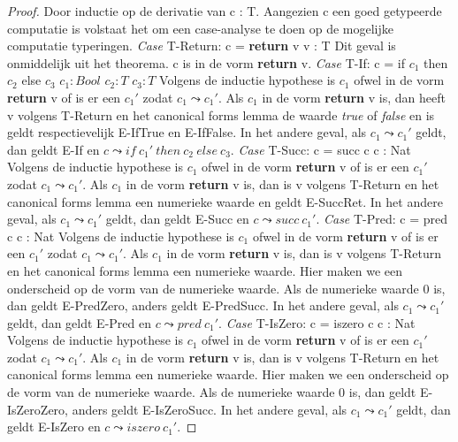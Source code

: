 \begin{proof}
    Door inductie op de derivatie van c : T. Aangezien c een goed getypeerde computatie is volstaat het om een case-analyse te doen op de mogelijke computatie typeringen. \newline
    \indent \textit{Case} T-Return: c = \textbf{return} v \quad v : T \newline
    Dit geval is onmiddelijk uit het theorema. c is in de vorm \textbf{return} v. \newline 
    \indent \textit{Case} T-If: c = if $c_1$ then $c_2$ else $c_3$ \quad $c_1 : Bool$ \quad $c_2 : T$ \quad $c_3 : T$ \newline
    Volgens de inductie hypothese is $c_1$ ofwel in de vorm \textbf{return} v of is er een $c_1'$ zodat $c_1 \leadsto c_1'$. Als $c_1$ in de vorm \textbf{return} v is, dan heeft v volgens T-Return en het canonical forms lemma de waarde \emph{true} of \emph{false} en is geldt respectievelijk E-IfTrue en E-IfFalse. In het andere geval, als $c_1 \leadsto c_1'$ geldt, dan geldt E-If en $c \leadsto if \  c_1' \  then \  c_2 \  else \  c_3$. \newline
    \indent \textit{Case} T-Succ: c = succ c \quad c : Nat \newline
    Volgens de inductie hypothese is $c_1$ ofwel in de vorm \textbf{return} v of is er een $c_1'$ zodat $c_1 \leadsto c_1'$. Als $c_1$ in de vorm \textbf{return} v is, dan is v volgens T-Return en het canonical forms lemma een numerieke waarde en geldt E-SuccRet. In het andere geval, als $c_1 \leadsto c_1'$ geldt, dan geldt E-Succ en $c \leadsto succ \  c_1'$. \newline
    \indent \textit{Case} T-Pred: c = pred c \quad c : Nat \newline
    Volgens de inductie hypothese is $c_1$ ofwel in de vorm \textbf{return} v of is er een $c_1'$ zodat $c_1 \leadsto c_1'$. Als $c_1$ in de vorm \textbf{return} v is, dan is v volgens T-Return en het canonical forms lemma een numerieke waarde. Hier maken we een onderscheid op de vorm van de numerieke waarde. Als de numerieke waarde 0 is, dan geldt E-PredZero, anders geldt E-PredSucc. In het andere geval, als $c_1 \leadsto c_1'$ geldt, dan geldt E-Pred en $c \leadsto pred \  c_1'$. \newline
    \indent \textit{Case} T-IsZero: c = iszero c \quad c : Nat \newline
    Volgens de inductie hypothese is $c_1$ ofwel in de vorm \textbf{return} v of is er een $c_1'$ zodat $c_1 \leadsto c_1'$. Als $c_1$ in de vorm \textbf{return} v is, dan is v volgens T-Return en het canonical forms lemma een numerieke waarde. Hier maken we een onderscheid op de vorm van de numerieke waarde. Als de numerieke waarde 0 is, dan geldt E-IsZeroZero, anders geldt E-IsZeroSucc. In het andere geval, als $c_1 \leadsto c_1'$ geldt, dan geldt E-IsZero en $c \leadsto iszero \  c_1'$. \newline
\end{proof}

